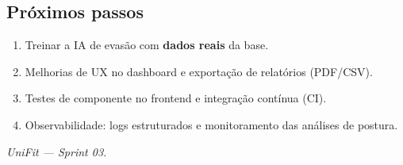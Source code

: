 \documentclass[11pt,a4paper,final]{article}
\begin{document}
\subsection{Próximos passos}

\begin{enumerate}
  \item Treinar a IA de evasão com \textbf{dados reais} da base.
  \item Melhorias de UX no dashboard e exportação de relatórios (PDF/CSV).
  \item Testes de componente no frontend e integração contínua (CI).
  \item Observabilidade: logs estruturados e monitoramento das análises de postura.
\end{enumerate}

\vfill
\begin{center}\small\itshape
 UniFit --- Sprint 03.
\end{center}
\end{document}
